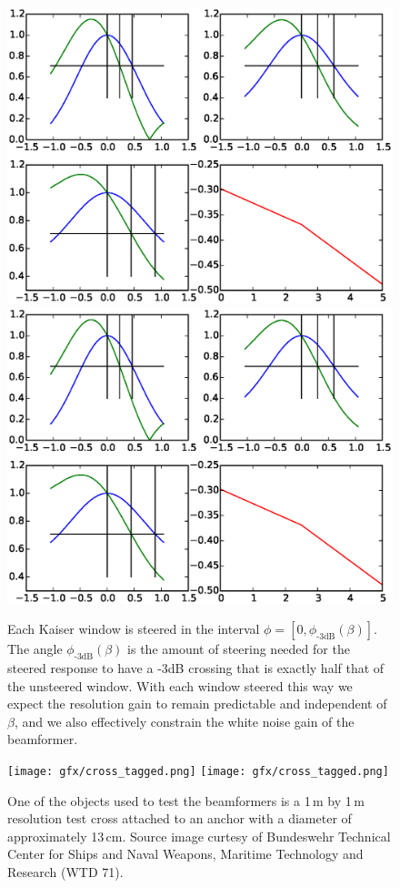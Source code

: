 \documentclass[10pt,journal,draftclsnofoot,onecolumn]{IEEEtran}
\let\MYoriglatexcaption\caption               %
\renewcommand{\caption}[2][\relax]{\MYoriglatexcaption[#2]{#2}}
\newcommand\1{\vec 1}
\begin{document}
\begin{figure}[tbp]\centering%
\ifPeerReview%
\includegraphics[width=.5\linewidth]{gfx/calc_kaiser_3dB.eps}%
\else%
\includegraphics[width=\linewidth]{gfx/calc_kaiser_3dB.eps}%
\fi%
\caption{Each Kaiser window is steered in the interval $\phi=[0, \phi_{\text{-3dB}}(\beta)]$. The angle $\phi_{\text{-3dB}}(\beta)$ is the amount of steering needed for the steered response to have a -3dB crossing that is exactly half that of the unsteered window. With each window steered this way we expect the resolution gain to remain predictable and independent of $\beta$, and we also effectively constrain the white noise gain of the beamformer.}\label{windows_steering}
\end{figure}

\begin{figure}[tbp]\centering%
\ifPeerReview%
\texttt{[image: gfx/cross\_tagged.png]}%
\else%
\texttt{[image: gfx/cross\_tagged.png]}%
\fi%
\caption{One of the objects used to test the beamformers is a 1\,m by 1\,m resolution test cross attached to an anchor with a diameter of approximately 13\,cm. Source image curtesy of Bundeswehr Technical Center for Ships and Naval Weapons, Maritime Technology and Research (WTD 71).}\label{cross}
\end{figure}
\end{document}
